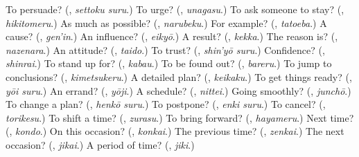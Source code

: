 \begin{tcolorbox}[breakable,colback=teal!4,colframe=teal!35!black,title={Before you move on}]
To persuade? (\textbf{}, \emph{settoku suru}.) To urge? (\textbf{}, \emph{unagasu}.) To ask someone to stay? (\textbf{}, \emph{hikitomeru}.) As much as possible? (\textbf{}, \emph{narubeku}.) For example? (\textbf{}, \emph{tatoeba}.) A cause? (\textbf{}, \emph{gen'in}.) An influence? (\textbf{}, \emph{eikyō}.) A result? (\textbf{}, \emph{kekka}.) The reason is? (\textbf{}, \emph{nazenara}.) An attitude? (\textbf{}, \emph{taido}.) To trust? (\textbf{}, \emph{shin'yō suru}.) Confidence? (\textbf{}, \emph{shinrai}.) To stand up for? (\textbf{}, \emph{kabau}.) To be found out? (\textbf{}, \emph{bareru}.) To jump to conclusions? (\textbf{}, \emph{kimetsukeru}.) A detailed plan? (\textbf{}, \emph{keikaku}.) To get things ready? (\textbf{}, \emph{yōi suru}.) An errand? (\textbf{}, \emph{yōji}.) A schedule? (\textbf{}, \emph{nittei}.) Going smoothly? (\textbf{}, \emph{junchō}.) To change a plan? (\textbf{}, \emph{henkō suru}.) To postpone? (\textbf{}, \emph{enki suru}.) To cancel? (\textbf{}, \emph{torikesu}.) To shift a time? (\textbf{}, \emph{zurasu}.) To bring forward? (\textbf{}, \emph{hayameru}.) Next time? (\textbf{}, \emph{kondo}.) On this occasion? (\textbf{}, \emph{konkai}.) The previous time? (\textbf{}, \emph{zenkai}.) The next occasion? (\textbf{}, \emph{jikai}.) A period of time? (\textbf{}, \emph{jiki}.)
\end{tcolorbox}
